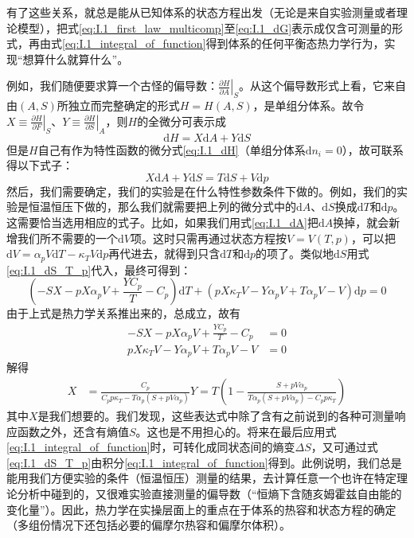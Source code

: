 \documentclass[main.tex]{subfiles}
\begin{document}
有了这些关系，就总是能从已知体系的状态方程出发（无论是来自实验测量或者理论模型），把式\eqref{eq:I.1_first_law_multicomp}至\eqref{eq:I.1_dG}表示成仅含可测量的形式，再由式\eqref{eq:I.1_integral_of_function}得到体系的任何平衡态热力学行为，实现“想算什么就算什么”。

例如，我们随便要求算一个古怪的偏导数：$\left.\frac{\partial H}{\partial A}\right|_{S}$。从这个偏导数形式上看，它来自由$\left(A,S\right)$所独立而完整确定的形式$H=H\left(A,S\right)$，是单组分体系。故令$X\equiv\left.\frac{\partial H}{\partial F}\right|_{S}$、$Y\equiv\left.\frac{\partial H}{\partial S}\right|_{A}$，则$H$的全微分可表示成
\[\mathrm{d}H=X\mathrm{d}A+Y\mathrm{d}S\]
但是$H$自己有作为特性函数的微分式\eqref{eq:I.1_dH}（单组分体系$\mathrm{d}n_i=0$），故可联系得以下式子：
\[X\mathrm{d}A+Y\mathrm{d}S=T\mathrm{d}S+V\mathrm{d}p\]
然后，我们需要确定，我们的实验是在什么特性参数条件下做的。例如，我们的实验是恒温恒压下做的，那么我们就需要把上列的微分式中的$\mathrm{d}A$、$\mathrm{d}S$换成$\mathrm{d}T$和$\mathrm{d}p$。这需要恰当选用相应的式子。比如，如果我们用式\eqref{eq:I.1_dA}把$\mathrm{d}A$换掉，就会新增我们所不需要的一个$\mathrm{d}V$项。这时只需再通过状态方程按$V=V\left(T,p\right)$，可以把$\mathrm{d}V=\alpha_pV\mathrm{d}T-\kappa_TV\mathrm{d}p$再代进去，就得到只含$\mathrm{d}T$和$\mathrm{d}p$的项了。类似地$\mathrm{d}S$用式\eqref{eq:I.1_dS_T_p}代入，最终可得到：
\[\left(-SX-pX\alpha_pV+\frac{YC_p}{T}-C_p\right)\mathrm{d}T+\left(pX\kappa_TV-Y\alpha_pV+T\alpha_pV-V\right)\mathrm{d}p=0\]
由于上式是热力学关系推出来的，总成立，故有
\begin{align*}
    -SX-pX\alpha_pV+\frac{YC_p}{T}-C_p  & =0 \\
    pX\kappa_TV-Y\alpha_pV+T\alpha_pV-V & =0
\end{align*}
解得
\begin{align*}
    X & =\frac{C_p}{C_p p \kappa_T-T\alpha_p\left(S+pV\alpha_p\right)}
    Y=T\left(1-\frac{S+p V \alpha_p}{T\alpha_p\left(S+pV\alpha_p\right)-C_pp\kappa_T}\right)
\end{align*}
其中$X$是我们想要的。我们发现，这些表达式中除了含有之前说到的各种可测量响应函数之外，还含有熵值$S$。这也是不用担心的。将来在最后应用式\eqref{eq:I.1_integral_of_function}时，可转化成同状态间的熵变$\Delta S$，又可通过式\eqref{eq:I.1_dS_T_p}由积分\eqref{eq:I.1_integral_of_function}得到。此例说明，我们总是能用我们方便实验的条件（恒温恒压）测量的结果，去计算任意一个也许在特定理论分析中碰到的，又很难实验直接测量的偏导数（“恒熵下含随亥姆霍兹自由能的变化量”）。因此，热力学在实操层面上的重点在于体系的热容和状态方程的确定（多组份情况下还包括必要的偏摩尔热容和偏摩尔体积）。
\end{document}
